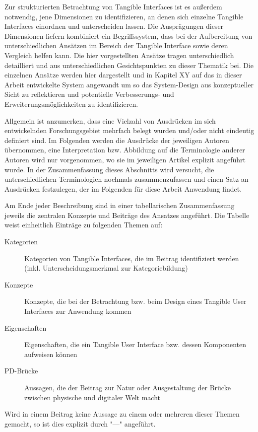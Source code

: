 Zur strukturierten Betrachtung von Tangible Interfaces ist es außerdem notwendig, jene Dimensionen zu identifizieren, an denen sich einzelne Tangible Interfaces einordnen und unterscheiden lassen. Die Ausprägungen dieser Dimensionen liefern kombiniert ein Begriffssystem, dass bei der Aufbereitung von unterschiedlichen Ansätzen im Bereich der Tangible Interface sowie deren Vergleich helfen kann. Die hier vorgestellten Ansätze tragen unterschiedlich detailliert und aus unterschiedlichen Gesichtspunkten zu dieser Thematik bei. Die einzelnen Ansätze werden hier dargestellt und in Kapitel XY auf das in dieser Arbeit entwickelte System angewandt um so das System-Design aus konzeptueller Sicht zu reflektieren und potentielle Verbesserungs- und Erweiterungsmöglichkeiten zu identifizieren.

Allgemein ist anzumerken, dass eine Vielzahl von Ausdrücken im sich entwickelnden Forschungsgebiet mehrfach belegt wurden und/oder nicht eindeutig definiert sind. Im Folgenden werden die Ausdrücke der jeweiligen Autoren übernommen, eine Interpretation bzw. Abbildung auf die Terminologie anderer Autoren wird nur vorgenommen, wo sie im jeweiligen Artikel explizit angeführt wurde. In der Zusammenfassung dieses Abschnitts wird versucht, die unterschiedlichen Terminologien nochmals zusammenzufassen und einen Satz an Ausdrücken festzulegen, der im Folgenden für diese Arbeit Anwendung findet.

Am Ende jeder Beschreibung sind in einer tabellarischen Zusammenfassung jeweils die zentralen Konzepte und Beiträge des Ansatzes angeführt. Die Tabelle weist einheitlich Einträge zu folgenden Themen auf:
\begin{description}
 \item[Kategorien] Kategorien von Tangible Interfaces, die im Beitrag identifiziert werden  (inkl. Unterscheidungsmerkmal zur Kategoriebildung)
 \item[Konzepte] Konzepte, die bei der Betrachtung bzw. beim Design eines Tangible User Interfaces zur Anwendung kommen 
 \item[Eigenschaften] Eigenschaften, die ein Tangible User Interface bzw. dessen Komponenten aufweisen können
 \item[PD-Brücke] Aussagen, die der Beitrag zur Natur oder Ausgestaltung der Brücke zwischen physische und digitaler Welt macht
\end{description}

Wird in einem Beitrag keine Aussage zu einem oder mehreren dieser Themen gemacht, so ist dies explizit durch "---" angeführt.

